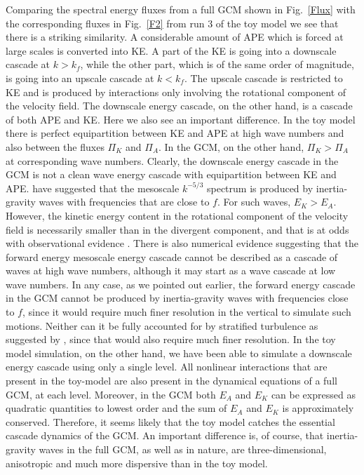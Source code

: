 Comparing the spectral energy fluxes from a full GCM shown in Fig.~\ref{Flux} with the corresponding fluxes in Fig.~\ref{F2} from run 3 of the toy model we see that there is a striking similarity. A considerable amount of APE which is forced at large scales is converted into KE. A part of the KE is going into a downscale cascade at $ k > k_f $, while the other part, which is of the same order of magnitude, is going into an upscale cascade at $ k < k_f $. The upscale cascade is restricted to KE and is produced by interactions only involving the rotational component of the velocity field. The downscale energy cascade, on the other hand, is a cascade of both APE and KE. Here we also see an important difference. In the toy model there is perfect equipartition between KE and APE at high wave numbers and also between the fluxes $ \Pi_K $ and $ \Pi_A $. In the GCM, on the other hand, $ \Pi_K > \Pi_A $ at corresponding wave numbers. Clearly, the downscale energy cascade in the GCM is not a clean wave energy cascade with equipartition between KE and APE. \citet{Callies-Ferrari-Buhler:2014} have suggested that the mesoscale $ k^{-5/3} $ spectrum is produced by inertia-gravity waves with frequencies that are close to $ f $. For such waves, $ E_K > E_A $. However, the kinetic energy content in the rotational component of the velocity field is necessarily smaller than in the divergent component, and that is at odds with observational evidence \citep{Lindborg:2015, QiangLi2017}.  There is also numerical evidence \citep{Deusebio-Augier-Lindborg:2013, Asselin2017} suggesting that the forward energy mesoscale energy cascade cannot be described as a cascade of waves at high wave numbers, although it may start as a wave cascade at low wave numbers. In any case, as we pointed out earlier, the forward energy cascade in the GCM cannot be produced by inertia-gravity waves with frequencies close to $ f $, since it would require much finer resolution in the vertical to simulate such motions. Neither can it be fully accounted for by stratified turbulence as suggested by \citet{Lindborg2006}, since that would also require much finer resolution. In the toy model simulation, on the other hand, we have been able to simulate a downscale energy cascade using only a single level. All nonlinear interactions that are present in the toy-model are also present in the dynamical equations of a full GCM, at each level. Moreover, in the GCM both $ E_A $   and $ E_K $ can be expressed as quadratic quantities to lowest order and the  sum of $ E_A $ and $ E_K $ is approximately conserved. Therefore, it seems likely that the toy model catches the essential cascade dynamics of the GCM. An important difference is, of course, that  inertia-gravity waves in the full GCM, as well as in nature, are three-dimensional, anisotropic and much more dispersive than in the toy model.


